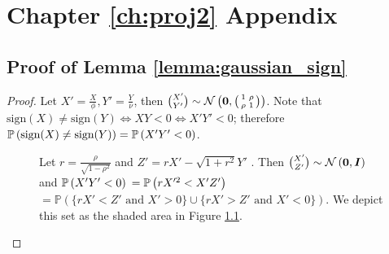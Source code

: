 \chapter{\label{app:3-proj2}Chapter \ref{ch:proj2} Appendix}

\section{Proof of Lemma \ref{lemma:gaussian_sign}}
\label{app:proof_sheppard}

\begin{proof}
 Let $X' = \frac{X}{\phi}, Y' = \frac{Y}{\nu}$, then $\binom{X'}{Y'} \sim \mathcal{N}\left( \bm{0}, \begin{psmallmatrix} 1 & \rho \\ \rho & 1 \end{psmallmatrix} \right)$. Note that $\text{sign}(X) \neq \text{sign}(Y) \iff XY < 0 \iff X'Y' < 0$; therefore $\prob{\text{sign}(X) \neq \text{sign}(Y) } = \prob{X'Y' < 0}$. 

\begin{figure}[H]
    \begin{minipage}[T]{0.48\columnwidth}
        \raggedright
        Let $r = \frac{\rho}{\sqrt{1-\rho^2}}$ and $Z' = rX' - \sqrt{1+r^{2}} Y'$ . 
        Then $\binom{X'}{Z'} \sim \mathcal{N}\left(\bm{0}, \bm{I}\right)$ and 
        $\prob{X'Y'<0}$
        \noindent$ = \prob{rX'^{2} < X'Z'} $ 
        \noindent$= 
        \mathbb{P}(\{rX' < Z' \text{ and } X' > 0\} \cup \{rX' > Z' \text{ and } X' < 0 \})$. 
        We depict this set as the shaded area in Figure \ref{fig:proof_fig}.
    \end{minipage}
    \hfill
    \begin{minipage}[T]{0.48\columnwidth}
        \centering
        
        \label{fig:proof_fig}
    \end{minipage}
\end{figure}


\end{proof}
